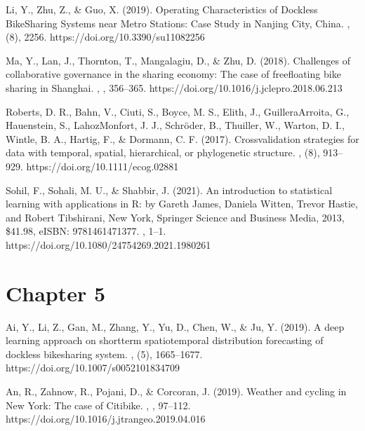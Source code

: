\documentclass[letterpaper,10pt,english]{jupyterBook}
\begin{document}
\sphinxAtStartPar
Li, Y., Zhu, Z., \& Guo, X. (2019). Operating Characteristics of Dockless Bike\sphinxhyphen{}Sharing Systems near Metro Stations: Case Study in Nanjing City, China. , (8), 2256. https://doi.org/10.3390/su11082256

\sphinxAtStartPar
Ma, Y., Lan, J., Thornton, T., Mangalagiu, D., \& Zhu, D. (2018). Challenges of collaborative governance in the sharing economy: The case of free\sphinxhyphen{}floating bike sharing in Shanghai. , , 356–365. https://doi.org/10.1016/j.jclepro.2018.06.213

\sphinxAtStartPar
Roberts, D. R., Bahn, V., Ciuti, S., Boyce, M. S., Elith, J., Guillera\sphinxhyphen{}Arroita, G., Hauenstein, S., Lahoz\sphinxhyphen{}Monfort, J. J., Schröder, B., Thuiller, W., Warton, D. I., Wintle, B. A., Hartig, F., \& Dormann, C. F. (2017). Cross\sphinxhyphen{}validation strategies for data with temporal, spatial, hierarchical, or phylogenetic structure. , (8), 913–929. https://doi.org/10.1111/ecog.02881

\sphinxAtStartPar
Sohil, F., Sohali, M. U., \& Shabbir, J. (2021). An introduction to statistical learning with applications in R: by Gareth James, Daniela Witten, Trevor Hastie, and Robert Tibshirani, New York, Springer Science and Business Media, 2013, \$41.98, eISBN: 978\sphinxhyphen{}1\sphinxhyphen{}4614\sphinxhyphen{}7137\sphinxhyphen{}7. , 1–1. https://doi.org/10.1080/24754269.2021.1980261


\section{Chapter 5}
\label{\detokenize{references:chapter-5}}
\sphinxAtStartPar
Ai, Y., Li, Z., Gan, M., Zhang, Y., Yu, D., Chen, W., \& Ju, Y. (2019). A deep learning approach on short\sphinxhyphen{}term spatiotemporal distribution forecasting of dockless bike\sphinxhyphen{}sharing system. , (5), 1665–1677. https://doi.org/10.1007/s00521\sphinxhyphen{}018\sphinxhyphen{}3470\sphinxhyphen{}9

\sphinxAtStartPar
An, R., Zahnow, R., Pojani, D., \& Corcoran, J. (2019). Weather and cycling in New York: The case of Citibike. , , 97–112. https://doi.org/10.1016/j.jtrangeo.2019.04.016
\end{document}
